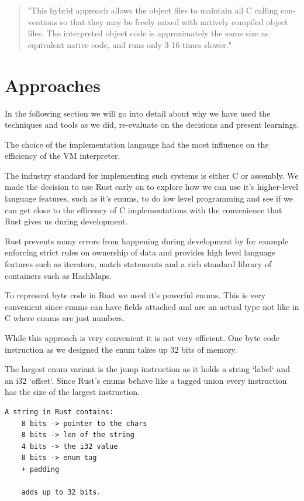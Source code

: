 \documentclass{article}
\begin{document}
\begin{quotation}
"This hybrid approach allows the object files to maintain all C calling con-
ventions so that they may be freely mixed with natively compiled object
files. The interpreted object code is approximately the same size as
equivalent native code, and runs only 3-16 times slower." ~\cite{superoperator}
\end{quotation}

\section{Approaches}
In the following section we will go into detail about why we have used the 
techniques and tools as we did, re-evaluate on the decisions and present 
learnings.

The choice of the implementation langauge had the most influence on the
efficiency of the VM interpreter.

The industry standard for implementing such systems is either C or assembly.
We made the decision to use Rust early on to explore how we can use it's
higher-level language features, such as it's enums, to do low level programming
and see if we can get close to the efficency of C implementations with the
convenience that Rust gives us during development.

Rust prevents many errors from happening during development by for example
enforcing strict rules on ownership of data and provides high level language
features such as iterators, match statements and a rich standard library of 
containers such as HashMaps.

To represent byte code in Rust we used it's powerful enums. This is very
convenient since enums can have fields attached and are an actual type not like
in C where enums are just numbers.

While this approach is very convenient it is not very efficient. One byte code
instruction as we designed the enum takes up 32 bits of memory.

The largest enum variant is the jump instruction as it holds a string `label`
and an i32 `offset`. Since Rust's enums behave like a tagged union every
instruction has the size of the largest instruction.

\begin{verbatim}
A string in Rust contains:
    8 bits -> pointer to the chars
    8 bits -> len of the string
    4 bits -> the i32 value
    8 bits -> enum tag
    + padding

    adds up to 32 bits.
\end{verbatim}
\end{document}
